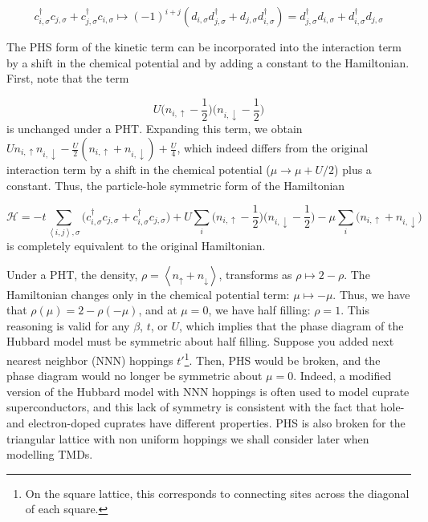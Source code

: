 \begin{equation}
c_{i, \sigma}^\dagger c_{j, \sigma} + c_{j, \sigma}^\dagger c_{i, \sigma} \mapsto (-1)^{i+j} ( d_{i, \sigma} d_{j, \sigma}^\dagger + d_{j, \sigma} d_{i, \sigma}^\dagger ) = d_{j, \sigma}^\dagger d_{i, \sigma} + d_{i, \sigma}^\dagger d_{j, \sigma}
\end{equation}

The \ac{PHS} form of the kinetic term can be incorporated into the interaction term by a shift in the chemical potential and by adding a constant to the Hamiltonian.
First, note that the term

\begin{equation*}
U \bigg( n_{i,\uparrow} - \frac{1}{2} \bigg) \bigg( n_{i,\downarrow} - \frac{1}{2} \bigg)
\end{equation*}
is unchanged under a \ac{PHT}.
Expanding this term, we obtain $U n_{i,\uparrow} n_{i,\downarrow} - \frac{U}{2} (n_{i,\uparrow} + n_{i,\downarrow}) + \frac{U}{4}$, which indeed differs from the original interaction term by a shift in the chemical potential ($\mu \rightarrow \mu + U / 2$) plus a constant.
Thus, the particle-hole symmetric form of the Hamiltonian 

\begin{equation}
\mathcal{H} = -t \sum_{\left\langle i, j \right \rangle, \sigma} \bigg( c_{i,\sigma}^\dagger c_{j,\sigma} + c_{i,\sigma}^\dagger c_{j,\sigma} \bigg) + U \sum_{i} \bigg( n_{i,\uparrow} - \frac{1}{2} \bigg) \bigg( n_{i,\downarrow} - \frac{1}{2} \bigg) -\mu \sum_i \bigg( n_{i,\uparrow} + n_{i,\downarrow} \bigg)
\end{equation}
is completely equivalent to the original Hamiltonian.

Under a \ac{PHT}, the density, $\rho = \left\langle n_\uparrow + n_\downarrow \right\rangle$, transforms as $\rho \mapsto 2 - \rho$.
The Hamiltonian changes only in the chemical potential term: $\mu \mapsto -\mu$.
Thus, we have that $\rho (\mu) = 2 - \rho (-\mu)$, and at $\mu = 0$, we have half filling: $\rho = 1$.
This reasoning is valid for any $\beta$, $t$, or $U$, which implies that the phase diagram of the Hubbard model must be symmetric about half filling.
Suppose you added next nearest neighbor (NNN) hoppings $t'$\footnote{On the square lattice, this corresponds to connecting sites across the diagonal of each square.}.
Then, \ac{PHS} would be broken, and the phase diagram would no longer be symmetric about $\mu = 0$.
Indeed, a modified version of the Hubbard model with NNN hoppings is often used to model cuprate superconductors, and this lack of symmetry is consistent with the fact that hole- and electron-doped cuprates have different properties. 
\ac{PHS} is also broken for the triangular lattice with non uniform hoppings we shall consider later when modelling \acp{TMD}.
